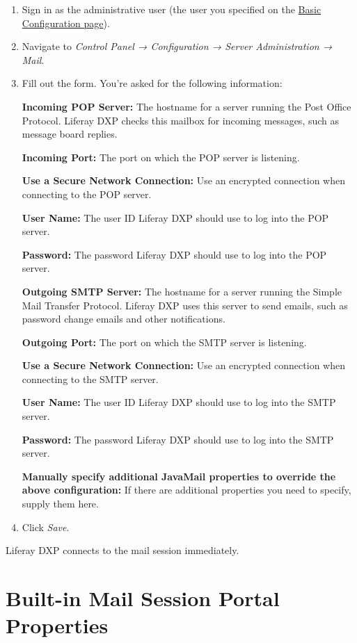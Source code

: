 \begin{enumerate}
\def\labelenumi{\arabic{enumi}.}
\item
  Sign in as the administrative user (the user you specified on the
  \href{/docs/7-2/deploy/-/knowledge_base/d/installing-product\#using-the-setup-wizard}{Basic
  Configuration page}).
\item
  Navigate to \emph{Control Panel → Configuration → Server
  Administration → Mail}.
\item
  Fill out the form. You're asked for the following information:

  \textbf{Incoming POP Server:} The hostname for a server running the
  Post Office Protocol. Liferay DXP checks this mailbox for incoming
  messages, such as message board replies.

  \textbf{Incoming Port:} The port on which the POP server is listening.

  \textbf{Use a Secure Network Connection:} Use an encrypted connection
  when connecting to the POP server.

  \textbf{User Name:} The user ID Liferay DXP should use to log into the
  POP server.

  \textbf{Password:} The password Liferay DXP should use to log into the
  POP server.

  \textbf{Outgoing SMTP Server:} The hostname for a server running the
  Simple Mail Transfer Protocol. Liferay DXP uses this server to send
  emails, such as password change emails and other notifications.

  \textbf{Outgoing Port:} The port on which the SMTP server is
  listening.

  \textbf{Use a Secure Network Connection:} Use an encrypted connection
  when connecting to the SMTP server.

  \textbf{User Name:} The user ID Liferay DXP should use to log into the
  SMTP server.

  \textbf{Password:} The password Liferay DXP should use to log into the
  SMTP server.

  \textbf{Manually specify additional JavaMail properties to override
  the above configuration:} If there are additional properties you need
  to specify, supply them here.
\item
  Click \emph{Save}.
\end{enumerate}

Liferay DXP connects to the mail session immediately.

\section{Built-in Mail Session Portal
Properties}\label{built-in-mail-session-portal-properties}

